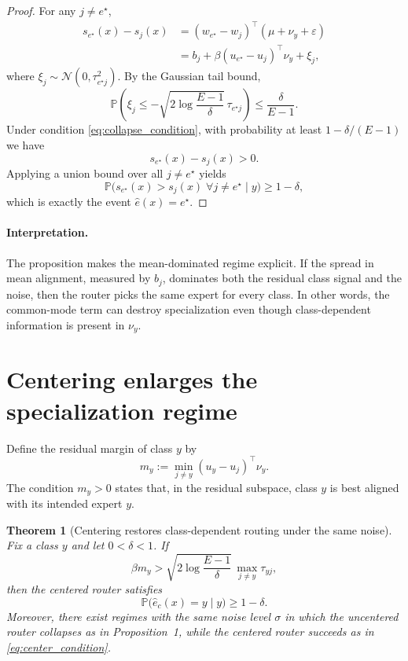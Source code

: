 \documentclass[11pt]{article}
\newtheorem{theorem}{Theorem}
\begin{document}
\begin{proof}
For any $j\neq e^\star$,
\begin{align}
    s_{e^\star}(x)-s_j(x)
    &= (w_{e^\star}-w_j)^\top (\mu+\nu_y+\varepsilon) \\
    &= b_j + \beta (u_{e^\star}-u_j)^\top \nu_y + \xi_j,
\end{align}
where $\xi_j\sim\mathcal N(0,\tau_{e^\star j}^2)$. By the Gaussian tail bound,
\begin{equation}
    \mathbb P\left(\xi_j\le -\sqrt{2\log\frac{E-1}{\delta}}\,\tau_{e^\star j}\right)
    \le \frac{\delta}{E-1}.
\end{equation}
Under condition \eqref{eq:collapse_condition}, with probability at least $1-\delta/(E-1)$ we have
\begin{equation}
    s_{e^\star}(x)-s_j(x) > 0.
\end{equation}
Applying a union bound over all $j\neq e^\star$ yields
\begin{equation}
    \mathbb P\bigl(s_{e^\star}(x)>s_j(x)\;\forall j\neq e^\star\mid y\bigr)\ge 1-\delta,
\end{equation}
which is exactly the event $\hat e(x)=e^\star$.
\end{proof}

\paragraph{Interpretation.}
The proposition makes the mean-dominated regime explicit. If the spread in mean alignment, measured by $b_j$, dominates both the residual class signal and the noise, then the router picks the same expert for every class. In other words, the common-mode term can destroy specialization even though class-dependent information is present in $\nu_y$.

\section{Centering enlarges the specialization regime}

Define the residual margin of class $y$ by
\begin{equation}
    m_y := \min_{j\neq y} (u_y-u_j)^\top \nu_y.
\end{equation}
The condition $m_y>0$ states that, in the residual subspace, class $y$ is best aligned with its intended expert $y$.

\begin{theorem}[Centering restores class-dependent routing under the same noise]
Fix a class $y$ and let $0<\delta<1$. If
\begin{equation}
    \beta m_y
    >
    \sqrt{2\log\frac{E-1}{\delta}}\,
    \max_{j\neq y}\tau_{yj},
    \label{eq:center_condition}
\end{equation}
then the centered router satisfies
\begin{equation}
    \mathbb P\bigl(\hat e_c(x)=y\mid y\bigr) \ge 1-\delta.
\end{equation}
Moreover, there exist regimes with the same noise level $\sigma$ in which the uncentered router collapses as in Proposition~1, while the centered router succeeds as in \eqref{eq:center_condition}.
\end{theorem}
\end{document}
